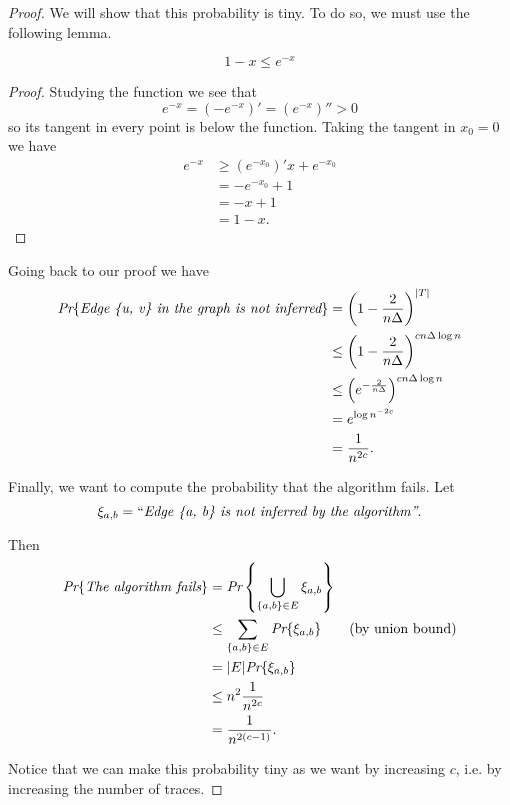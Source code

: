 \begin{proof}
	We will show that this probability is tiny. To do so, we must use the following lemma.
	
	\begin{lem}
		\begin{equation}
		1 - x \leq e^{-x}
		\end{equation} 
	\end{lem}
	\begin{proof}
	Studying the function we see that $$e^{-x} = (-e^{-x})' = (e^{-x})'' > 0$$ so its tangent in every point is below the function. Taking the tangent in $x_0=0$ we have
	\begin{align*}
	e^{-x} &\geq (e^{-x_0})'x + e^{-x_0}\\
		   & = -e^{-x_0} + 1\\
		   & = -x + 1\\
		   & = 1 - x.
	\end{align*}
	\end{proof}
	
	Going back to our proof we have
	\begin{align}
	\emph{Pr}\{\emph{Edge \{u, v\} in the graph is not inferred}\} &= \left(1-\frac{2}{n\Delta}\right)^{|T|} \\
	&\leq \left(1- \frac{2}{n\Delta}\right)^{cn\Delta\log n}\\
	& \leq \left(e^{-\frac{2}{n\Delta}}\right)^{cn\Delta\log n}\\
	& = e^{\log n^{-2c}}\\
	& = \frac{1}{n^{2c}}.
	\end{align}

Finally, we want to compute the probability that the algorithm fails. Let $$\xi_{a,b} = ``\emph{Edge \{a, b\} is not inferred by the algorithm''}.$$

Then
\begin{align}
\emph{Pr}\{\emph{The algorithm fails}\} &= \emph{Pr}\left\{\bigcup_{\{a, b\} \in E} \xi_{a,b}\right\}\\
&\leq \sum_{\{a, b\} \in E} \emph{Pr}\{\xi_{a,b}\} \tag{by union bound}\\
& = |E| \emph{Pr}\{\xi_{a,b}\} \\
& \leq n^2 \frac{1}{n^{2c}}\\
& = \frac{1}{n^{2(c-1)}}. 
\end{align}

Notice that we can make this probability tiny as we want by increasing $c$, i.e. by increasing the number of traces.
\end{proof}
